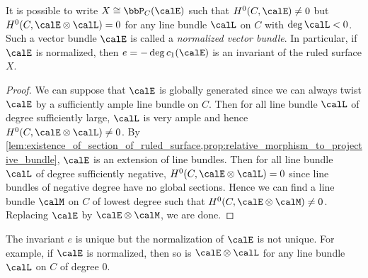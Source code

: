 
    \begin{lemma}\label{lem:existence_of_normalized_vector_bundle}
        It is possible to write \(X \cong \bbP_C(\calE)\) such that \(H^0(C,\calE) \neq 0\) but \(H^0(C,\calE \otimes \calL) = 0\) for any line bundle \(\calL\) on \(C\) with \(\deg \calL < 0\).
        Such a vector bundle \(\calE\) is called a \emph{normalized vector bundle}.
        In particular, if \(\calE\) is normalized, then \(e = -\deg c_1(\calE)\) is an invariant of the ruled surface \(X\).
    \end{lemma}
    \begin{proof}
        We can suppose that \(\calE\) is globally generated since we can always twist \(\calE\) by a sufficiently ample line bundle on \(C\).
        Then for all line bundle \(\calL\) of degree sufficiently large, \(\calL\) is very ample and hence \(H^0(C,\calE \otimes \calL) \neq 0\).
        By \cref{lem:existence_of_section_of_ruled_surface,prop:relative_morphism_to_projective_bundle}, \(\calE\) is an extension of line bundles.
        Then for all line bundle \(\calL\) of degree sufficiently negative, \(H^0(C,\calE \otimes \calL) = 0\) since line bundles of negative degree have no global sections.
        Hence we can find a line bundle \(\calM\) on \(C\) of lowest degree such that \(H^0(C,\calE \otimes \calM) \neq 0\).
        Replacing \(\calE\) by \(\calE \otimes \calM\), we are done.
    \end{proof}

    \begin{remark}\label{rmk:e_is_unique_but_normalization_is_not}
        The invariant \(e\) is unique but the normalization of \(\calE\) is not unique.
        For example, if \(\calE\) is normalized, then so is \(\calE \otimes \calL\) for any line bundle \(\calL\) on \(C\) of degree \(0\).
    \end{remark}

